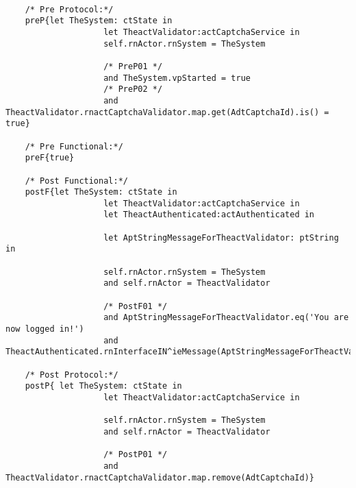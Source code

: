 	\scriptsize
	\vspace{0.5cm}
	\begin{lstlisting}[style=MessirStyle,firstnumber=auto,captionpos=b,caption={\msrmessir (MCL-oriented) specification of the operation \emph{oeCaptchaValid}.},label=OM-actCaptchaService-oeCaptchaValid-MCL-LST]

	/* Pre Protocol:*/ 
	preP{let TheSystem: ctState in
	  				let TheactValidator:actCaptchaService in
					self.rnActor.rnSystem = TheSystem
	  
					/* PreP01 */
					and TheSystem.vpStarted = true
					/* PreP02 */
					and TheactValidator.rnactCaptchaValidator.map.get(AdtCaptchaId).is() = true}
	
	/* Pre Functional:*/
	preF{true}
	
	/* Post Functional:*/ 
	postF{let TheSystem: ctState in
					let TheactValidator:actCaptchaService in
					let TheactAuthenticated:actAuthenticated in
					
					let AptStringMessageForTheactValidator: ptString in
					  
					self.rnActor.rnSystem = TheSystem
					and self.rnActor = TheactValidator
					
					/* PostF01 */
					and AptStringMessageForTheactValidator.eq('You are now logged in!')
					and TheactAuthenticated.rnInterfaceIN^ieMessage(AptStringMessageForTheactValidator)}
	
	/* Post Protocol:*/ 
	postP{ let TheSystem: ctState in
				  	let TheactValidator:actCaptchaService in
				  
				  	self.rnActor.rnSystem = TheSystem
				  	and self.rnActor = TheactValidator
				  	
				  	/* PostP01 */
					and TheactValidator.rnactCaptchaValidator.map.remove(AdtCaptchaId)}
	
	\end{lstlisting}
	\normalsize 
	
	
	
	





